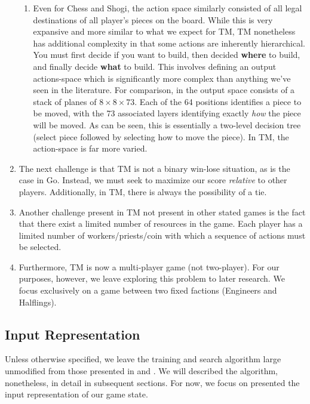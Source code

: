 \documentclass[12pt,twocolumn,letterpaper]{article}
\begin{document}
\begin{enumerate}
\begin{enumerate}
        \item Even for Chess and Shogi, the action space similarly consisted of all legal destinations of all player's pieces on the board. While this is very expansive and more similar to what we expect for TM, TM nonetheless has additional complexity in that some actions are inherently hierarchical. You must first decide if you want to build, then decided \textbf{where} to build, and finally decide \textbf{what} to build. This involves defining an output actions-space which is significantly more complex than anything we've seen in the literature. For comparison, in \cite{AlphaZero} the output space consists of a stack of planes of $8\times 8 \times 73$. Each of the 64 positions identifies a piece to be moved, with the 73 associated layers identifying exactly \textit{how} the piece will be moved. As can be seen, this is essentially a two-level decision tree (select piece followed by selecting how to move the piece). In TM, the action-space is far more varied.
    \end{enumerate}
    \item The next challenge is that TM is not a binary win-lose situation, as is the case in Go. Instead, we must seek to maximize our score \textit{relative} to other players. Additionally, in TM, there is always the possibility of a tie. 
    \item Another challenge present in TM not present in other stated games is the fact that there exist a limited number of resources in the game. Each player has a limited number of workers/priests/coin with which a sequence of actions must be selected.
    \item Furthermore, TM is now a multi-player game (not two-player). For our purposes, however, we leave exploring this problem to later research. We focus exclusively on a game between two fixed factions (Engineers and Halflings).
\end{enumerate}

\subsection{Input Representation}
\label{subsection:input_representation}
Unless otherwise specified, we leave the training and search algorithm large unmodified from those presented in \cite{AlphaZero} and \cite{AlphaGoZero}. We will described the algorithm, nonetheless, in detail in subsequent sections. For now, we focus on presented the input representation of our game state.
\end{document}
